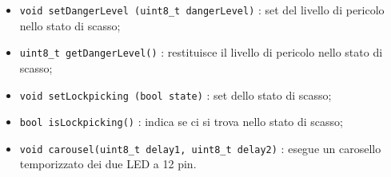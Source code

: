 \begin{itemize}
	\item \texttt{void setDangerLevel (uint8\_t dangerLevel)} :  set del livello di pericolo nello stato di scasso;
	\item \texttt{uint8\_t getDangerLevel()} : restituisce il livello di pericolo nello stato di scasso;
	\item \texttt{void setLockpicking (bool state)} : set dello stato di scasso;
	\item \texttt{bool isLockpicking()} : indica se ci si trova nello stato di scasso;
	\item \texttt{void carousel(uint8\_t delay1, uint8\_t delay2)} : esegue un carosello temporizzato dei due LED a 12 pin.
\end{itemize}



